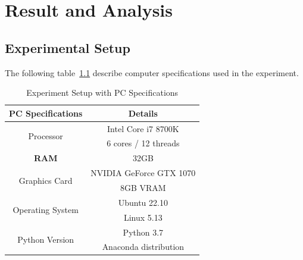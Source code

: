 \chapter{Result and Analysis}\label{ch:result-and-analysis}
\section{Experimental Setup}\label{sec:experimental-setup}
The following table~\ref{tab:experiment_setup} describe computer specifications used in the experiment.
\begin{table}[htbp]
    \centering
    \begin{tabular}{|c|c|}
        \hline
        \textbf{PC Specifications} & \textbf{Details} \\
        \hline
        \multirow{2}{*}{Processor} & Intel Core i7 8700K \\
        & 6 cores / 12 threads \\
        \hline
        \textbf{RAM} & 32GB \\
        \hline
        \multirow{2}{*}{Graphics Card} & NVIDIA GeForce GTX 1070 \\
        & 8GB VRAM \\
        \hline
        \multirow{2}{*}{Operating System} & Ubuntu 22.10 \\
        & Linux 5.13 \\
        \hline
        \multirow{2}{*}{Python Version} & Python 3.7 \\
        & Anaconda distribution \\
        \hline
    \end{tabular}
     \caption{Experiment Setup with PC Specifications}
    \label{tab:experiment_setup}
\end{table}

